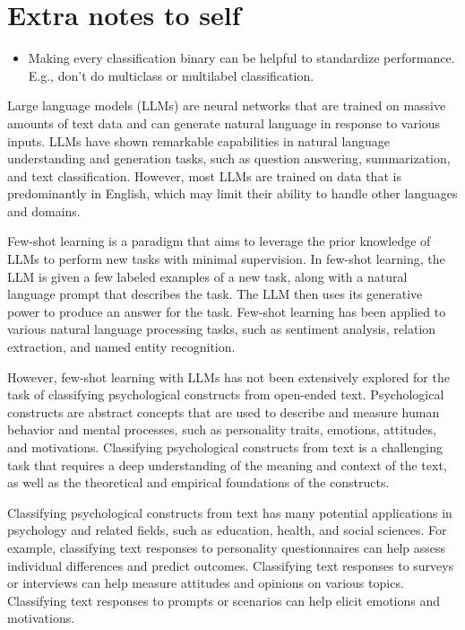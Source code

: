\documentclass[
  10pt,
  twocolumn]{article}
\providecommand{\tightlist}{%
  \setlength{\itemsep}{0pt}\setlength{\parskip}{0pt}}\usepackage{longtable,booktabs,array}
\begin{document}
\hypertarget{extra-notes-to-self}{%
\section{Extra notes to self}\label{extra-notes-to-self}}

\begin{itemize}
\tightlist
\item
  Making every classification binary can be helpful to standardize
  performance. E.g., don't do multiclass or multilabel classification.
\end{itemize}

Large language models (LLMs) are neural networks that are trained on
massive amounts of text data and can generate natural language in
response to various inputs. LLMs have shown remarkable capabilities in
natural language understanding and generation tasks, such as question
answering, summarization, and text classification. However, most LLMs
are trained on data that is predominantly in English, which may limit
their ability to handle other languages and domains.

Few-shot learning is a paradigm that aims to leverage the prior
knowledge of LLMs to perform new tasks with minimal supervision. In
few-shot learning, the LLM is given a few labeled examples of a new
task, along with a natural language prompt that describes the task. The
LLM then uses its generative power to produce an answer for the task.
Few-shot learning has been applied to various natural language
processing tasks, such as sentiment analysis, relation extraction, and
named entity recognition.

However, few-shot learning with LLMs has not been extensively explored
for the task of classifying psychological constructs from open-ended
text. Psychological constructs are abstract concepts that are used to
describe and measure human behavior and mental processes, such as
personality traits, emotions, attitudes, and motivations. Classifying
psychological constructs from text is a challenging task that requires a
deep understanding of the meaning and context of the text, as well as
the theoretical and empirical foundations of the constructs.

Classifying psychological constructs from text has many potential
applications in psychology and related fields, such as education,
health, and social sciences. For example, classifying text responses to
personality questionnaires can help assess individual differences and
predict outcomes. Classifying text responses to surveys or interviews
can help measure attitudes and opinions on various topics. Classifying
text responses to prompts or scenarios can help elicit emotions and
motivations.
\end{document}
